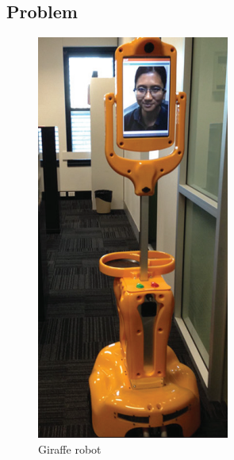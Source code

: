 \documentclass[12pt]{article}
\begin{document}
\subsection{Problem}
\begin{figure}
	\centering
	\includegraphics[scale=0.4]{P2.png}
	\caption{Giraffe robot\cite{1}}
	\label{fig::giraffe}
\end{figure}
\end{document}

